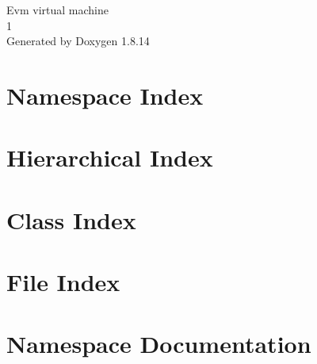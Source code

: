 \documentclass[twoside]{book}
\newcommand{\+}{\discretionary{\mbox{\scriptsize$\hookleftarrow$}}{}{}}
\newcommand{\clearemptydoublepage}{%
  \newpage{\pagestyle{empty}\cleardoublepage}%
}
\begin{document}
\hypersetup{pageanchor=false,
             bookmarksnumbered=true,
             pdfencoding=unicode
            }
\begin{titlepage}
\vspace*{7cm}
\begin{center}%
{\Large Evm virtual machine \\[1ex]\large 1 }\\
\vspace*{1cm}
{\large Generated by Doxygen 1.8.14}\\
\end{center}
\end{titlepage}
\clearemptydoublepage
{}
\tableofcontents
\clearemptydoublepage
{}
\hypersetup{pageanchor=true}

\chapter{Namespace Index}

\chapter{Hierarchical Index}

\chapter{Class Index}

\chapter{File Index}

\chapter{Namespace Documentation}



\end{document}
